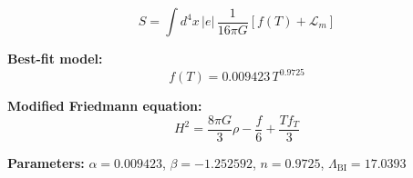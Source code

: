 
\begin{equation}
  S = \int d^4x \, |e| \, \frac{1}{16\pi G} \left[ f(T) + \mathcal{L}_m \right]
\end{equation}

\textbf{Best-fit model:}
\begin{equation}
  f(T) = 0.009423 \, T^{0.9725}
\end{equation}

\textbf{Modified Friedmann equation:}
\begin{equation}
  H^2 = \frac{8\pi G}{3} \rho - \frac{f}{6} + \frac{T f_T}{3}
\end{equation}

\textbf{Parameters:}
$\alpha = 0.009423$, \quad
$\beta = -1.252592$, \quad
$n = 0.9725$, \quad
$\Lambda_{\text{BI}} = 17.0393$